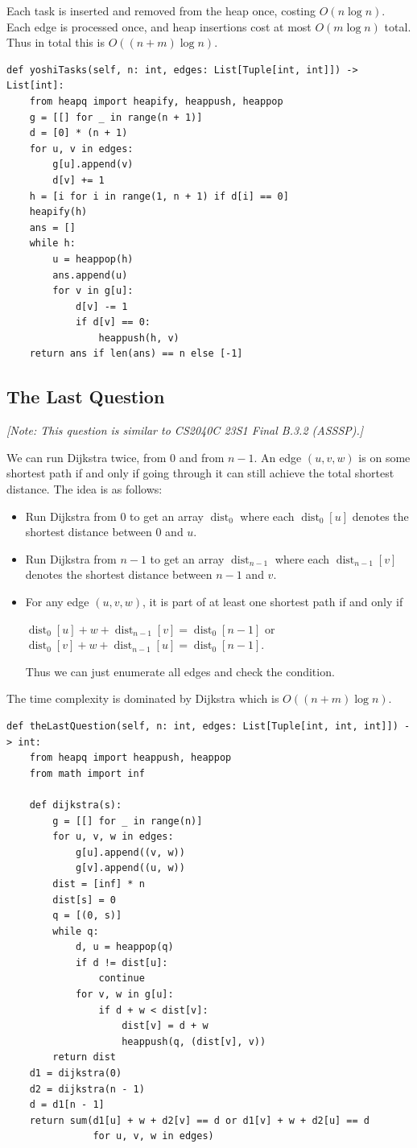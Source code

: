 \documentclass[12pt]{article}
\DeclareMathOperator{\dist}{dist}
\begin{document}
Each task is inserted and removed from the heap once, costing $O(n\log n)$. Each edge is processed once, and heap insertions cost at most $O(m\log n)$ total. Thus in total this is $O((n+m)\log n)$.

\begin{verbatim}
def yoshiTasks(self, n: int, edges: List[Tuple[int, int]]) -> List[int]:
    from heapq import heapify, heappush, heappop
    g = [[] for _ in range(n + 1)]
    d = [0] * (n + 1)
    for u, v in edges:
        g[u].append(v)
        d[v] += 1
    h = [i for i in range(1, n + 1) if d[i] == 0]
    heapify(h)
    ans = []
    while h:
        u = heappop(h)
        ans.append(u)
        for v in g[u]:
            d[v] -= 1
            if d[v] == 0:
                heappush(h, v)
    return ans if len(ans) == n else [-1]
\end{verbatim}
\newpage
\subsection{The Last Question}
\textit{[Note: This question is similar to CS2040C 23S1 Final B.3.2 (ASSSP).]}

We can run Dijkstra twice, from $0$ and from $n-1$. An edge $(u, v, w)$ is on some shortest path if and only if going through it can still achieve the total shortest distance. The idea is as follows:
\begin{itemize}
\item Run Dijkstra from $0$ to get an array $\dist_0$ where each $\dist_0[u]$ denotes the shortest distance between $0$ and $u$.
\item Run Dijkstra from $n-1$ to get an array $\dist_{n-1}$ where each $\dist_{n-1}[v]$ denotes the shortest distance between $n-1$ and $v$.
\item For any edge $(u,v,w)$, it is part of at least one shortest path if and only if

$\dist_0[u]+w+\dist_{n-1}[v]=\dist_0[n-1]$ or $\dist_0[v]+w+\dist_{n-1}[u]=\dist_0[n-1]$.

Thus we can just enumerate all edges and check the condition.
\end{itemize}

The time complexity is dominated by Dijkstra which is $O((n+m)\log n)$.

\begin{verbatim}
def theLastQuestion(self, n: int, edges: List[Tuple[int, int, int]]) -> int:
    from heapq import heappush, heappop
    from math import inf

    def dijkstra(s):
        g = [[] for _ in range(n)]
        for u, v, w in edges:
            g[u].append((v, w))
            g[v].append((u, w))
        dist = [inf] * n
        dist[s] = 0
        q = [(0, s)]
        while q:
            d, u = heappop(q)
            if d != dist[u]:
                continue
            for v, w in g[u]:
                if d + w < dist[v]:
                    dist[v] = d + w
                    heappush(q, (dist[v], v))
        return dist
    d1 = dijkstra(0)
    d2 = dijkstra(n - 1)
    d = d1[n - 1]
    return sum(d1[u] + w + d2[v] == d or d1[v] + w + d2[u] == d
               for u, v, w in edges)
\end{verbatim}
\newpage
\end{document}
